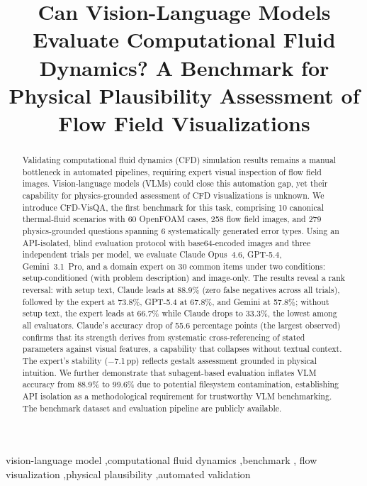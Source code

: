 \documentclass[preprint,12pt]{elsarticle}
\begin{document}
\begin{frontmatter}

\title{Can Vision-Language Models Evaluate Computational Fluid Dynamics? A Benchmark for Physical Plausibility Assessment of Flow Field Visualizations}


\begin{abstract}
Validating computational fluid dynamics (CFD) simulation results remains a manual
bottleneck in automated pipelines, requiring expert visual inspection of flow field
images. Vision-language models (VLMs) could close this automation gap, yet their
capability for physics-grounded assessment of CFD visualizations is unknown. We
introduce CFD-VisQA, the first benchmark for this task, comprising 10 canonical
thermal-fluid scenarios with 60 OpenFOAM cases, 258 flow field images, and 279
physics-grounded questions spanning 6 systematically generated error types. Using an
API-isolated, blind evaluation protocol with base64-encoded images and three
independent trials per model, we evaluate Claude Opus~4.6, GPT-5.4, Gemini~3.1~Pro,
and a domain expert on 30 common items under two conditions: setup-conditioned (with
problem description) and image-only. The results reveal a rank reversal:
with setup text, Claude leads at 88.9\% (zero false negatives across all trials),
followed by the expert at 73.8\%, GPT-5.4 at 67.8\%, and Gemini at 57.8\%; without
setup text, the expert leads at 66.7\% while Claude drops to 33.3\%, the lowest
among all evaluators. Claude's accuracy drop of 55.6 percentage points (the largest
observed) confirms that its strength derives from systematic cross-referencing of
stated parameters against visual features, a capability that collapses without
textual context. The expert's stability ($-$7.1\,pp) reflects gestalt assessment
grounded in physical intuition. We further demonstrate that subagent-based evaluation
inflates VLM accuracy from 88.9\% to 99.6\% due to potential filesystem
contamination, establishing API isolation as a methodological requirement for
trustworthy VLM benchmarking. The benchmark dataset and evaluation pipeline are
publicly available.
\end{abstract}

\begin{keyword}
vision-language model \sep computational fluid dynamics \sep benchmark \sep
flow visualization \sep physical plausibility \sep automated validation
\end{keyword}

\end{frontmatter}
\end{document}
